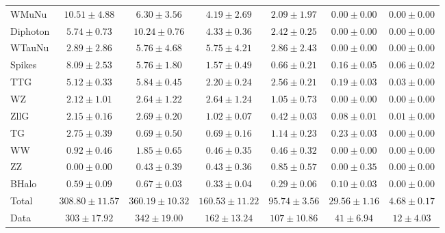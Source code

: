 \begin{table}[htbp]
\begin{center}
\begin{tabular}{|l|c|c|c|c|c|c|}
      WMuNu & $10.51{\pm}4.88$ & $6.30{\pm}3.56$ & $4.19{\pm}2.69$ & $2.09{\pm}1.97$ & $0.00{\pm}0.00$ & $0.00{\pm}0.00$ \\
      Diphoton & $5.74{\pm}0.73$ & $10.24{\pm}0.76$ & $4.33{\pm}0.36$ & $2.42{\pm}0.25$ & $0.00{\pm}0.00$ & $0.00{\pm}0.00$ \\
      WTauNu & $2.89{\pm}2.86$ & $5.76{\pm}4.68$ & $5.75{\pm}4.21$ & $2.86{\pm}2.43$ & $0.00{\pm}0.00$ & $0.00{\pm}0.00$ \\
      Spikes & $8.09{\pm}2.53$ & $5.76{\pm}1.80$ & $1.57{\pm}0.49$ & $0.66{\pm}0.21$ & $0.16{\pm}0.05$ & $0.06{\pm}0.02$ \\
      TTG & $5.12{\pm}0.33$ & $5.84{\pm}0.45$ & $2.20{\pm}0.24$ & $2.56{\pm}0.21$ & $0.19{\pm}0.03$ & $0.03{\pm}0.00$ \\
      WZ & $2.12{\pm}1.01$ & $2.64{\pm}1.22$ & $2.64{\pm}1.24$ & $1.05{\pm}0.73$ & $0.00{\pm}0.00$ & $0.00{\pm}0.00$ \\
      ZllG & $2.15{\pm}0.16$ & $2.69{\pm}0.20$ & $1.02{\pm}0.07$ & $0.42{\pm}0.03$ & $0.08{\pm}0.01$ & $0.01{\pm}0.00$ \\
      TG & $2.75{\pm}0.39$ & $0.69{\pm}0.50$ & $0.69{\pm}0.16$ & $1.14{\pm}0.23$ & $0.23{\pm}0.03$ & $0.00{\pm}0.00$ \\
      WW & $0.92{\pm}0.46$ & $1.85{\pm}0.65$ & $0.46{\pm}0.35$ & $0.46{\pm}0.32$ & $0.00{\pm}0.00$ & $0.00{\pm}0.00$ \\
      ZZ & $0.00{\pm}0.00$ & $0.43{\pm}0.39$ & $0.43{\pm}0.36$ & $0.85{\pm}0.57$ & $0.00{\pm}0.35$ & $0.00{\pm}0.00$ \\
      BHalo & $0.59{\pm}0.09$ & $0.67{\pm}0.03$ & $0.33{\pm}0.04$ & $0.29{\pm}0.06$ & $0.10{\pm}0.03$ & $0.00{\pm}0.00$ \\
      \hline
      Total & $308.80{\pm}11.57$ & $360.19{\pm}10.32$ & $160.53{\pm}11.22$ & $95.74{\pm}3.56$ & $29.56{\pm}1.16$ & $4.68{\pm}0.17$ \\
      \hline
      Data & $303{\pm}17.92$ & $342{\pm}19.00$ & $162{\pm}13.24$ & $107{\pm}10.86$ & $41{\pm}6.94$ & $12{\pm}4.03$ \\
      \hline
    \end{tabular}
  \end{center}
\end{table}



